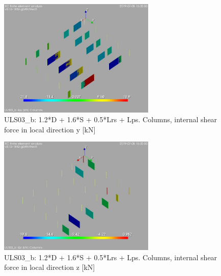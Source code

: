 \begin{figure}
\begin{center}
\includegraphics[width=75mm]{annex_res_columns/graphics/resSimplLC/ULS03_bcolumnsQy}
\caption{ULS03\_b: 1.2*D + 1.6*S + 0.5*Lrs + Lps. Columns, internal shear force in local direction y [kN]}
\end{center}
\end{figure}
\begin{figure}
\begin{center}
\includegraphics[width=75mm]{annex_res_columns/graphics/resSimplLC/ULS03_bcolumnsQz}
\caption{ULS03\_b: 1.2*D + 1.6*S + 0.5*Lrs + Lps. Columns, internal shear force in local direction z [kN]}
\end{center}
\end{figure}

